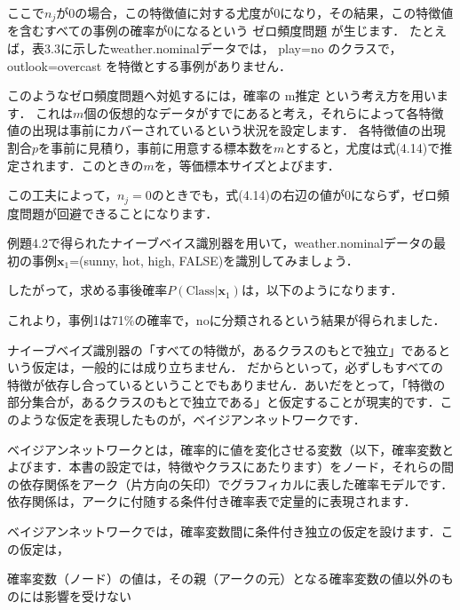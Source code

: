 
ここで$n_{j}$が0の場合，この特徴値に対する尤度が$0$になり，その結果，この特徴値を含むすべての事例の確率が$0$になるという
ゼロ頻度問題
が生じます．
たとえば，表3.3に示したweather.nominalデータでは， play=no のクラスで，outlook=overcast を特徴とする事例がありません．

このようなゼロ頻度問題へ対処するには，確率の
m推定
という考え方を用います．
これは$m$個の仮想的なデータがすでにあると考え，それらによって各特徴値の出現は事前にカバーされているという状況を設定します．
各特徴値の出現割合$p$を事前に見積り，事前に用意する標本数を$m$とすると，尤度は式(4.14)で推定されます．このときの$m$を，等価標本サイズとよびます．


この工夫によって，$n_j = 0$のときでも，式(4.14)の右辺の値が0にならず，ゼロ頻度問題が回避できることになります．


例題4.2で得られたナイーブベイス識別器を用いて，weather.nominalデータの最初の事例$\bm{x}_1$=(sunny, hot, high, FALSE)を識別してみましょう．



したがって，求める事後確率$P(\mbox{Class}|\bm{x}_1)$は，以下のようになります．



これより，事例1は71\%の確率で，noに分類されるという結果が得られました．


ナイーブベイズ識別器の「すべての特徴が，あるクラスのもとで独立」であるという仮定は，一般的には成り立ちません．
だからといって，必ずしもすべての特徴が依存し合っているということでもありません．あいだをとって，「特徴の部分集合が，あるクラスのもとで独立である」と仮定することが現実的です．このような仮定を表現したものが，ベイジアンネットワークです．

ベイジアンネットワークとは，確率的に値を変化させる変数（以下，確率変数とよびます．本書の設定では，特徴やクラスにあたります）をノード，それらの間の依存関係をアーク（片方向の矢印）でグラフィカルに表した確率モデルです．依存関係は，アークに付随する条件付き確率表で定量的に表現されます．

ベイジアンネットワークでは，確率変数間に条件付き独立の仮定を設けます．この仮定は，

確率変数（ノード）の値は，その親（アークの元）となる確率変数の値以外のものには影響を受けない

